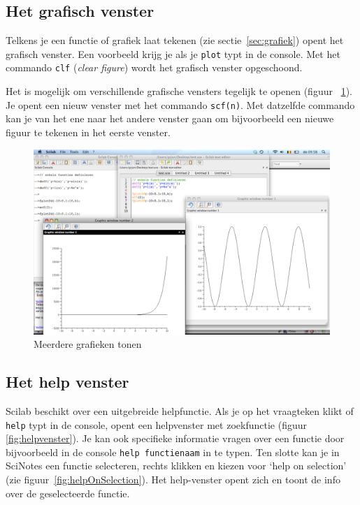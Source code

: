 \subsection{Het grafisch venster}
Telkens je een functie of grafiek laat tekenen (zie sectie~\ref{sec:grafiek}) opent het grafisch venster. Een voorbeeld krijg je als je \verb+plot+ typt in de console.  Met het commando \verb/clf/ (\emph{clear figure}) wordt het grafisch venster opgeschoond. 

Het is mogelijk om verschillende grafische vensters tegelijk te openen (figuur ~\ref{fig:grafisch_venster}). Je opent een nieuw venster met het commando \verb+scf(n)+. Met datzelfde commando kan je van het ene naar het andere venster gaan om bijvoorbeeld een  nieuwe figuur te tekenen in het eerste venster. 
\begin{figure}[h!t]
   \begin{center}
    \includegraphics[width=\textwidth]{figuren/scilab/04grafisch_venster}
  \caption{Meerdere grafieken tonen}
	\label{fig:grafisch_venster}
	\end{center}
\end{figure}

\subsection{Het help venster}
Scilab beschikt over een uitgebreide helpfunctie. Als je op het vraagteken klikt of \verb+help+ typt in de console, opent een helpvenster met zoekfunctie (figuur \ref{fig:helpvenster}). Je kan ook specifieke informatie vragen over een functie door bijvoorbeeld in de console \verb+help functienaam+ in te typen. Ten slotte kan je in SciNotes een functie selecteren, rechts klikken en kiezen voor `help on selection' (zie figuur~\ref{fig:helpOnSelection}). Het help-venster opent zich en toont de info over de geselecteerde functie.

